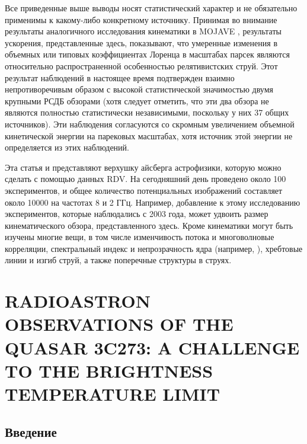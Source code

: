 Все приведенные выше выводы носят статистический характер и не обязательно применимы к
какому-либо конкретному источнику. Принимая во внимание результаты аналогичного исследования
кинематики в MOJAVE \cite{Homan_2009}, результаты ускорения, представленные здесь, показывают, что
умеренные изменения в объемных или типовых коэффициентах Лоренца в масштабах парсек являются
относительно распространенной особенностью релятивистских струй. Этот результат наблюдений в
настоящее время подтвержден взаимно непротиворечивым образом с высокой статистической значимостью
двумя крупными РСДБ обзорами (хотя следует отметить, что эти два обзора не являются
полностью статистически независимыми, поскольку у них 37 общих источников). Эти наблюдения
согласуются со скромным увеличением объемной кинетической энергии на парековых масштабах, хотя
источник этой энергии не определяется из этих наблюдений.

Эта статья и \cite{Piner_2007} представляют верхушку айсберга астрофизики, которую можно сделать с
помощью данных RDV. На сегодняшний день проведено около 100 экспериментов, и общее количество
потенциальных изображений составляет около 10000 на частотах 8 и 2 ГГц. Например, добавление к этому
исследованию экспериментов, которые наблюдались с 2003 года, может удвоить размер
кинематического обзора, представленного здесь. Кроме кинематики могут быть изучены многие вещи, в
том числе изменчивость потока и многоволновые корреляции, спектральный индекс и непрозрачность
ядра (например, \cite{Kovalev_2008,Pushkarev_Kovalev_2012}), хребтовые линии и изгиб струй, а
также поперечные структуры в струях.


\section{RADIOASTRON OBSERVATIONS OF THE QUASAR 3C273:
A CHALLENGE TO THE BRIGHTNESS TEMPERATURE LIMIT}

\subsection{Введение}

